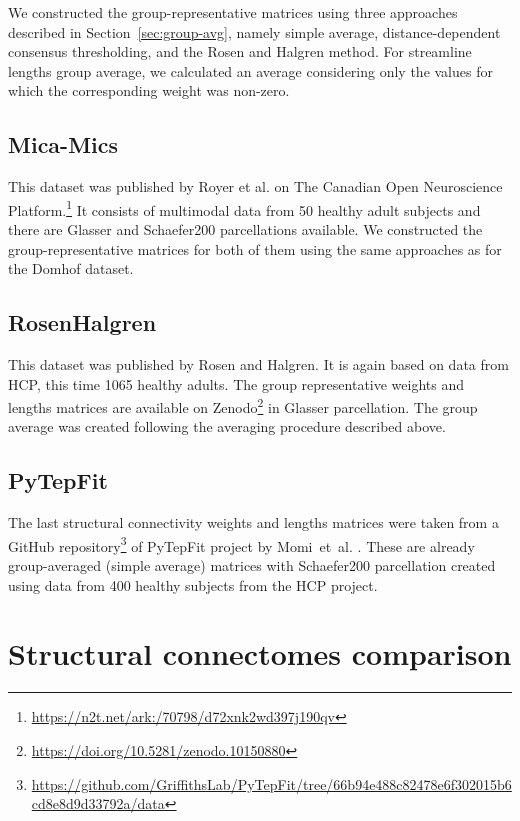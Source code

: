 We constructed the group-representative matrices using three approaches described in Section~\ref{sec:group-avg}, namely simple average, distance-dependent consensus thresholding, and the Rosen and Halgren method. For streamline lengths group average, we calculated an average considering only the values for which the corresponding weight was non-zero.

\subsection{Mica-Mics}

This dataset was published by Royer et al. \cite{royer_open_2021} on The Canadian Open Neuroscience Platform.\footnote{\url{https://n2t.net/ark:/70798/d72xnk2wd397j190qv}} It consists of multimodal data from 50 healthy adult subjects and there are Glasser and Schaefer200 parcellations available. We constructed the group-representative matrices for both of them using the same approaches as for the Domhof dataset.

\subsection{RosenHalgren}

This dataset was published by Rosen and Halgren. \cite{rosen_whole-cortex_2021} It is again based on data from HCP, this time 1065 healthy adults. The group representative weights and lengths matrices are available on Zenodo\footnote{\url{https://doi.org/10.5281/zenodo.10150880}} in Glasser parcellation. The group average was created following the averaging procedure described above. 

\subsection{PyTepFit}

The last structural connectivity weights and lengths matrices were taken from a GitHub repository\footnote{\url{https://github.com/GriffithsLab/PyTepFit/tree/66b94e488c82478e6f302015b6cd8e8d9d33792a/data}} of PyTepFit project by Momi~et~al. \cite{momi_tms-evoked_2023}. These are already group-averaged (simple average) matrices with Schaefer200 parcellation created using data from 400 healthy subjects from the HCP project. 

\section{Structural connectomes comparison}


